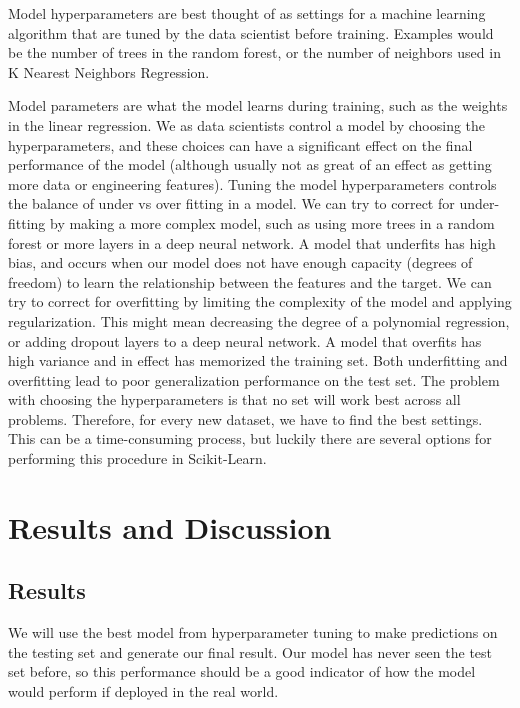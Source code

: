 \documentclass{article}
\begin{document}
Model hyperparameters are best thought of as settings for a machine learning algorithm that are tuned by the data scientist before training. Examples would be the number of trees in the random forest, or the number of neighbors used in K Nearest Neighbors Regression.

Model parameters are what the model learns during training, such as the weights in the linear regression. We as data scientists control a model by choosing the hyperparameters, and these choices can have a significant effect on the final performance of the model (although usually not as great of an effect as getting more data or engineering features). Tuning the model hyperparameters controls the balance of under vs over fitting in a model. We can try to correct for under-fitting by making a more complex model, such as using more trees in a random forest or more layers in a deep neural network. A model that underfits has high bias, and occurs when our model does not have enough capacity (degrees of freedom) to learn the relationship between the features and the target. We can try to correct for overfitting by limiting the complexity of the model and applying regularization. This might mean decreasing the degree of a polynomial regression, or adding dropout layers to a deep neural network. A model that overfits has high variance and in effect has memorized the training set. Both underfitting and overfitting lead to poor generalization performance on the test set.
The problem with choosing the hyperparameters is that no set will work best across all problems. Therefore, for every new dataset, we have to find the best settings. This can be a time-consuming process, but luckily there are several options for performing this procedure in Scikit-Learn.


\section*{Results and Discussion}
\subsection*{Results}
We will use the best model from hyperparameter tuning to make predictions on the testing set and generate our final result. Our model has never seen the test set before, so this performance should be a good indicator of how the model would perform if deployed in the real world.
\end{document}
